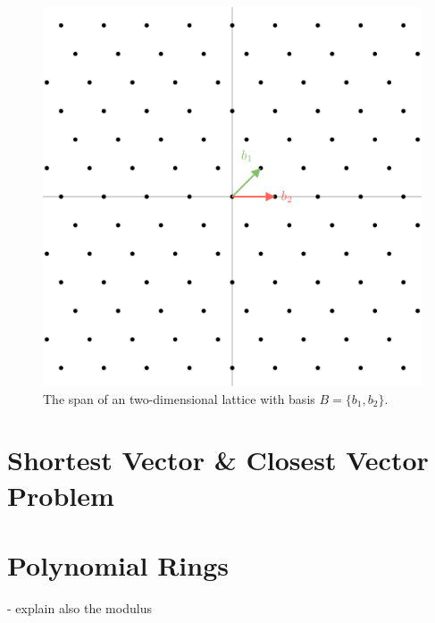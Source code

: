\begin{figure}[h]
    \centering
    \includegraphics[scale=0.2]{images/LatticeGrid.png}
    \caption[Span of an Lattice]{The span of an two-dimensional lattice with basis  $B = \{b_1, b_2\}$.}
    \label{fig:latticeGrid}
\end{figure}

\section{Shortest Vector \& Closest Vector Problem}

\section{Polynomial Rings}
- explain also the modulus

